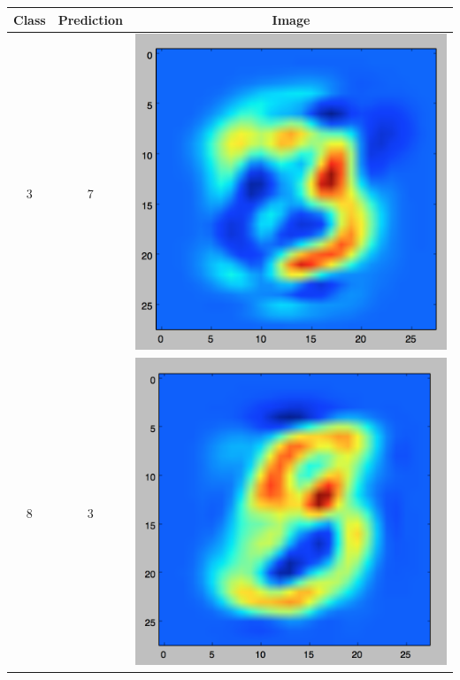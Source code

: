 \documentclass[11pt]{article}
\begin{document}
\begin{table}[!th]
\centering
\begin{tabular}{|c|c|c|}
\hline
Class & Prediction & Image \\
\hline
3 & 7 & \includegraphics[scale=.15]{images/knn3_3_7.png} \\
\hline
8 & 3 & \includegraphics[scale=.15]{images/knn3_8_3.png} \\

\end{tabular}
\end{table}
\end{document}
